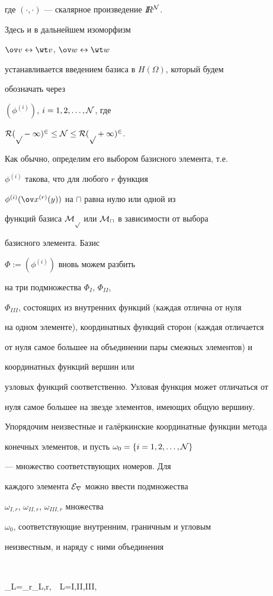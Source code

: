где $(\cdot,\cdot)$ --- скалярное произведение $I\!\!R^{\cal N}$.


Здесь и в дальнейшем изоморфизм


$\ov v\leftrightarrow \wt v$, $\ov w\leftrightarrow \wt w$


устанавливается введением базиса в $H(\Omega)$, который будем


обозначать через


$(\phi^{(i)})$, $i=1,2,\dotsc,\cal N$, где


$\cal R(p-1)^2\le\cal N\le\cal R(p+1)^2$.


Как обычно, определим его выбором базисного элемента, т.е.


$\phi^{(i)}$ такова, что для любого $r$ функция


$\phi^{(i)}(\ov x\r(y))$ на $\sqcap$ равна нулю или одной из


функций базиса $\cal M_ p$ или $\cal M_ \sqcap$ в зависимости от выбора


базисного элемента. Базис


$\Phi:=(\phi^{(i)})$ вновь можем разбить 


на три подмножества $\Phi_I$, $\Phi_{II}$,


$\Phi_{III}$, состоящих из внутренних функций (каждая отлична от нуля


на одном элементе), координатных функций сторон (каждая отличается


от нуля самое большее на объединении пары смежных элементов) и


координатных функций вершин или


узловых функций соответственно. Узловая функция может отличаться от


нуля самое большее на звезде элементов, имеющих общую вершину.


Упорядочим неизвестные и гал\"еркинские координатные функции метода


конечных элементов, и пусть $\omega_0=\{i=1,2,\dotsc,{\cal N}\}$


--- множество соответствующих номеров. Для


каждого элемента $\cal E_r$ можно ввести подмножества


$\omega_{I,r}$, $\omega_{II,r}$, $\omega_{III,r}$ множества


$\omega_0$, соответствующие внутренним, граничным и угловым


неизвестным, и наряду с ними объединения


$$


\omega_L=\bigcup_r\omega_{L,r},\ \ L=I,II,III,


